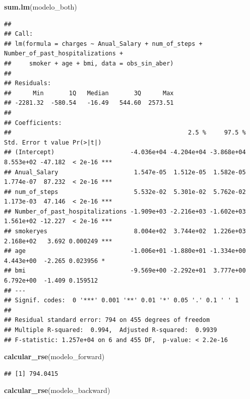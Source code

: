 \documentclass[
]{article}
\newenvironment{Shaded}{\begin{snugshade}}{\end{snugshade}}
\newcommand{\FunctionTok}[1]{\textcolor[rgb]{0.13,0.29,0.53}{\textbf{#1}}}
\newcommand{\NormalTok}[1]{#1}
\begin{document}
\begin{Shaded}
\begin{Highlighting}[]
\FunctionTok{sum.lm}\NormalTok{(modelo\_both)}
\end{Highlighting}
\end{Shaded}

\begin{verbatim}
## 
## Call:
## lm(formula = charges ~ Anual_Salary + num_of_steps + Number_of_past_hospitalizations + 
##     smoker + age + bmi, data = obs_sin_aber)
## 
## Residuals:
##      Min       1Q   Median       3Q      Max 
## -2281.32  -580.54   -16.49   544.60  2573.51 
## 
## Coefficients:
##                                                 2.5 %     97.5 % Std. Error t value Pr(>|t|)    
## (Intercept)                     -4.036e+04 -4.204e+04 -3.868e+04  8.553e+02 -47.182  < 2e-16 ***
## Anual_Salary                     1.547e-05  1.512e-05  1.582e-05  1.774e-07  87.232  < 2e-16 ***
## num_of_steps                     5.532e-02  5.301e-02  5.762e-02  1.173e-03  47.146  < 2e-16 ***
## Number_of_past_hospitalizations -1.909e+03 -2.216e+03 -1.602e+03  1.561e+02 -12.227  < 2e-16 ***
## smokeryes                        8.004e+02  3.744e+02  1.226e+03  2.168e+02   3.692 0.000249 ***
## age                             -1.006e+01 -1.880e+01 -1.334e+00  4.443e+00  -2.265 0.023956 *  
## bmi                             -9.569e+00 -2.292e+01  3.777e+00  6.792e+00  -1.409 0.159512    
## ---
## Signif. codes:  0 '***' 0.001 '**' 0.01 '*' 0.05 '.' 0.1 ' ' 1
## 
## Residual standard error: 794 on 455 degrees of freedom
## Multiple R-squared:  0.994,  Adjusted R-squared:  0.9939 
## F-statistic: 1.257e+04 on 6 and 455 DF,  p-value: < 2.2e-16
\end{verbatim}

\begin{Shaded}
\begin{Highlighting}[]
\FunctionTok{calcular\_rse}\NormalTok{(modelo\_forward)}
\end{Highlighting}
\end{Shaded}

\begin{verbatim}
## [1] 794.0415
\end{verbatim}

\begin{Shaded}
\begin{Highlighting}[]
\FunctionTok{calcular\_rse}\NormalTok{(modelo\_backward)}
\end{Highlighting}
\end{Shaded}
\end{document}
